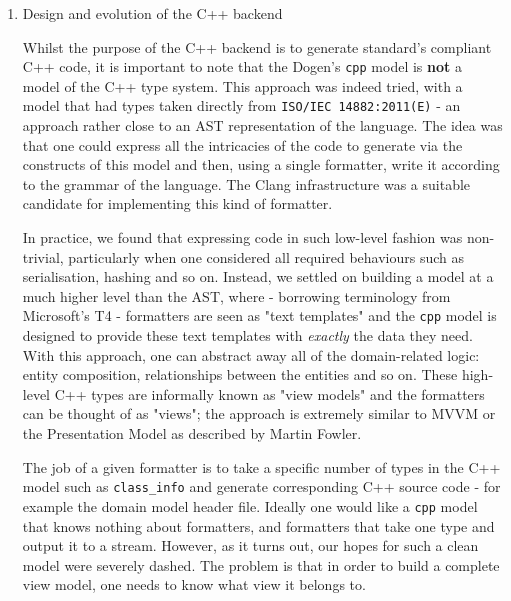 \documentclass[11pt]{article}
\begin{document}
\begin{enumerate}
\begin{enumerate}
\begin{enumerate}
\begin{enumerate}
\item Design and evolution of the C++ backend
\label{sec-2-2-1-2-3-1-1}

Whilst the purpose of the C++ backend is to generate standard's
compliant C++ code, it is important to note that the Dogen's \texttt{cpp}
model is \textbf{not} a model of the C++ type system. This approach was
indeed tried, with a model that had types taken directly from \texttt{ISO/IEC
14882:2011(E)} - an approach rather close to an AST representation of
the language. The idea was that one could express all the intricacies
of the code to generate via the constructs of this model and then,
using a single formatter, write it according to the grammar of the
language. The Clang infrastructure was a suitable candidate for
implementing this kind of formatter.

In practice, we found that expressing code in such low-level fashion
was non-trivial, particularly when one considered all required
behaviours such as serialisation, hashing and so on. Instead, we
settled on building a model at a much higher level than the AST,
where - borrowing terminology from Microsoft's T4 - formatters are
seen as "text templates" and the \texttt{cpp} model is designed to provide
these text templates with \emph{exactly} the data they need. With this
approach, one can abstract away all of the domain-related logic:
entity composition, relationships between the entities and so
on. These high-level C++ types are informally known as "view models"
and the formatters can be thought of as "views"; the approach is
extremely similar to MVVM or the Presentation Model as described by
Martin Fowler.

The job of a given formatter is to take a specific number of types in
the C++ model such as \texttt{class\_info} and generate corresponding C++
source code - for example the domain model header file. Ideally one
would like a \texttt{cpp} model that knows nothing about formatters, and
formatters that take one type and output it to a stream. However, as
it turns out, our hopes for such a clean model were severely
dashed. The problem is that in order to build a complete view model,
one needs to know what view it belongs to.


\end{enumerate}
\end{enumerate}
\end{enumerate}
\end{enumerate}
\end{document}
